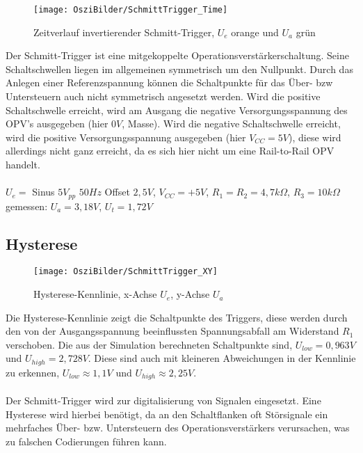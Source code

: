 \begin{figure}[H]
 \begin{center}
  \texttt{[image: OsziBilder/SchmittTrigger\_Time]}
 \end{center}
 \caption{Zeitverlauf invertierender Schmitt-Trigger, $U_e$ orange und $U_a$ grün}
\end{figure}
\noindent
\newpage
\noindent
Der Schmitt-Trigger ist eine mitgekoppelte Operationsverstärkerschaltung. Seine Schaltschwellen liegen im allgemeinen symmetrisch
um den Nullpunkt. Durch das Anlegen einer Referenzspannung können die Schaltpunkte für das Über- bzw Untersteuern auch nicht
symmetrisch angesetzt werden. Wird die positive Schaltschwelle erreicht, wird am Ausgang die negative Versorgungsspannung
des OPV's ausgegeben (hier $0V$, Masse). Wird die negative Schaltschwelle erreicht, wird die positive Versorgungsspannung
ausgegeben (hier $V_{CC} = 5V$), diese wird allerdings nicht ganz erreicht, da es sich hier nicht um eine Rail-to-Rail OPV handelt.\\
\\
$U_e=$ Sinus $5V_{pp}$ $50Hz$ Offset $2,5V$, $V_{CC} = +5V$, $R_1=R_2=4,7k\Omega$, $R_3=10k\Omega$\\
gemessen: $U_a=3,18V$, $U_t=1,72V$\\

\subsection{Hysterese}

\begin{figure}[H]
 \begin{center}
  \texttt{[image: OsziBilder/SchmittTrigger\_XY]}
 \end{center}
 \caption{Hysterese-Kennlinie, x-Achse $U_e$, y-Achse $U_a$}
\end{figure}
\noindent
Die Hysterese-Kennlinie zeigt die Schaltpunkte des Triggers, diese werden durch den von der
Ausgangsspannung beeinflussten Spannungsabfall am Widerstand $R_1$ verschoben. Die aus der Simulation
berechneten Schaltpunkte sind, $U_{low}=0,963V$ und $U_{high}=2,728V$. Diese sind auch mit kleineren
Abweichungen in der Kennlinie zu erkennen, $U_{low}\approx 1,1V$ und $U_{high}\approx 2,25V$.\\
\\
Der Schmitt-Trigger wird zur digitalisierung von Signalen eingesetzt. Eine Hysterese wird hierbei benötigt,
da an den Schaltflanken oft Störsignale ein mehrfaches Über- bzw. Untersteuern des Operationsverstärkers verursachen, was
zu falschen Codierungen führen kann.
